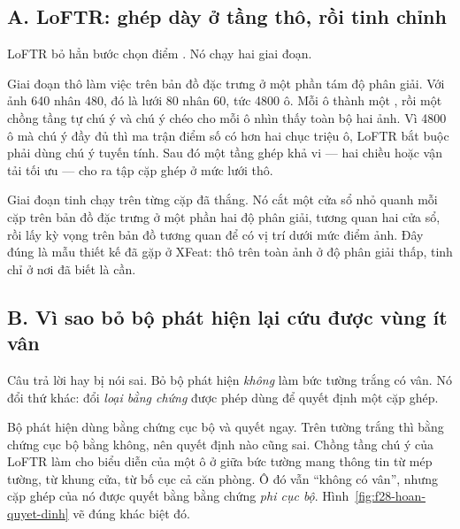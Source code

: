 \documentclass[../../deep_learning.tex]{subfiles}
\begin{document}
\subsection{A. LoFTR: ghép dày ở tầng thô, rồi tinh chỉnh}
LoFTR bỏ hẳn bước chọn điểm \cite{sun2021loftr}. Nó chạy hai giai đoạn.

Giai đoạn thô làm việc trên bản đồ đặc trưng ở một phần tám độ phân giải. Với ảnh 640 nhân 480, đó là lưới 80 nhân 60, tức 4800 ô. Mỗi ô thành một , rồi một chồng tầng tự chú ý và chú ý chéo cho mỗi ô nhìn thấy toàn bộ hai ảnh. Vì 4800 ô mà chú ý đầy đủ thì ma trận điểm số có hơn hai chục triệu ô, LoFTR bắt buộc phải dùng chú ý tuyến tính. Sau đó một tầng ghép khả vi ---  hai chiều hoặc vận tải tối ưu --- cho ra tập cặp ghép ở mức lưới thô.

Giai đoạn tinh chạy trên từng cặp đã thắng. Nó cắt một cửa sổ nhỏ quanh mỗi cặp trên bản đồ đặc trưng ở một phần hai độ phân giải, tương quan hai cửa sổ, rồi lấy kỳ vọng trên bản đồ tương quan để có vị trí dưới mức điểm ảnh. Đây đúng là mẫu thiết kế đã gặp ở XFeat: thô trên toàn ảnh ở độ phân giải thấp, tinh chỉ ở nơi đã biết là cần.

\subsection{B. Vì sao bỏ bộ phát hiện lại cứu được vùng ít vân}
Câu trả lời hay bị nói sai. Bỏ bộ phát hiện \emph{không} làm bức tường trắng có vân. Nó đổi thứ khác: đổi \emph{loại bằng chứng} được phép dùng để quyết định một cặp ghép.

Bộ phát hiện dùng bằng chứng cục bộ và quyết ngay. Trên tường trắng thì bằng chứng cục bộ bằng không, nên quyết định nào cũng sai. Chồng tầng chú ý của LoFTR làm cho biểu diễn của một ô ở giữa bức tường mang thông tin từ mép tường, từ khung cửa, từ bố cục cả căn phòng. Ô đó vẫn ``không có vân'', nhưng cặp ghép của nó được quyết bằng bằng chứng \emph{phi cục bộ}. Hình~\ref{fig:f28-hoan-quyet-dinh} vẽ đúng khác biệt đó.
\end{document}
